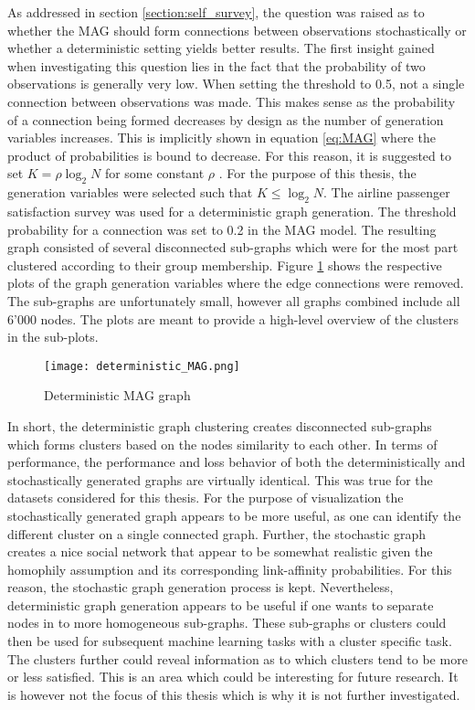   As addressed in section \ref{section:self_survey}, the question was raised 
  as to whether the MAG should form connections between observations
  stochastically or whether a deterministic setting yields better results. The 
  first insight gained when investigating this question lies in the fact that 
  the probability of two observations is generally very low. When setting the 
  threshold to 0.5, not a single connection between observations was made. This
  makes sense as the probability of a connection being formed decreases by
  design as the number of generation variables increases. This is implicitly
  shown in equation \ref{eq:MAG} where the product of probabilities is bound to
  decrease. For this reason, it is suggested to set $K=\rho\log_{2}N$
  for some constant $\rho$ \citep[p. 122]{kim2012multiplicative}. For the
  purpose of this thesis, the generation variables were selected such that
  $K\leqslant\log_{2} N$. The airline passenger satisfaction survey was used
  for a deterministic graph generation. The threshold probability for a
  connection was set to 0.2 in the MAG model. The resulting graph consisted of
  several disconnected sub-graphs which were for the most part clustered
  according to their group membership. Figure \ref{fig:det_MAG} shows the
  respective plots of the graph generation variables where the edge connections
  were removed. The sub-graphs are unfortunately small, however all graphs
  combined include all 6'000 nodes. The plots are meant to provide a high-level
  overview of the clusters in the sub-plots. 

  \begin{figure}[h]
		\centering
		\texttt{[image: deterministic\_MAG.png]}
		\caption{Deterministic MAG graph}
        \label{fig:det_MAG}
  \end{figure}

  \noindent In short, the deterministic graph clustering creates disconnected 
  sub-graphs which forms clusters based on the nodes similarity to each other.
  In terms of performance, the performance and loss behavior of both the
  deterministically and stochastically generated graphs are virtually
  identical. This was true for the datasets considered for this thesis. For the 
  purpose of visualization the stochastically generated graph appears
  to be more useful, as one can identify the different cluster on a single
  connected graph. Further, the stochastic graph creates a nice social
  network that appear to be somewhat realistic given the homophily assumption
  and its corresponding link-affinity probabilities. For this reason, the
  stochastic graph generation process is kept. Nevertheless, deterministic
  graph generation appears to be useful if one wants to separate nodes in to
  more homogeneous sub-graphs. These sub-graphs or clusters could then be used
  for subsequent machine learning tasks with a cluster specific task. The
  clusters further could reveal information as to which clusters tend to be
  more or less satisfied. This is an area which could be interesting for future
  research. It is however not the focus of this thesis which is why it is not
  further investigated. 
  
